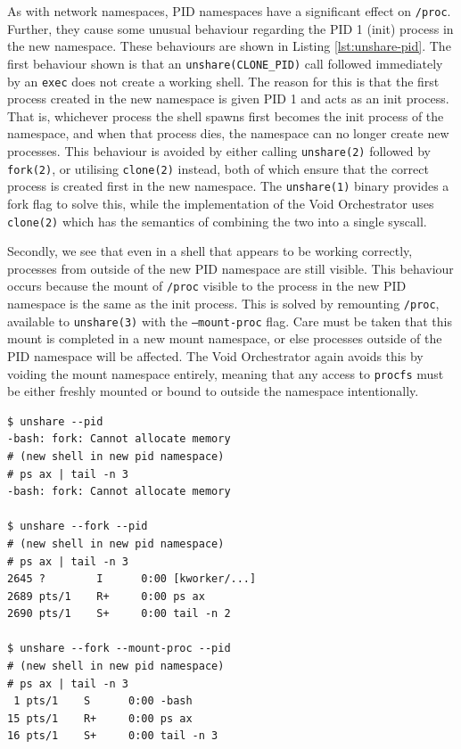 \documentclass[12pt,a4paper,twoside]{report}
\begin{document}
As with network namespaces, PID namespaces have a significant effect on \texttt{/proc}. Further, they cause some unusual behaviour regarding the PID 1 (init) process in the new namespace. These behaviours are shown in Listing \ref{lst:unshare-pid}. The first behaviour shown is that an \texttt{unshare(CLONE\_PID)} call followed immediately by an \texttt{exec} does not create a working shell. The reason for this is that the first process created in the new namespace is given PID 1 and acts as an init process. That is, whichever process the shell spawns first becomes the init process of the namespace, and when that process dies, the namespace can no longer create new processes. This behaviour is avoided by either calling \texttt{unshare(2)} followed by \texttt{fork(2)}, or utilising \texttt{clone(2)} instead, both of which ensure that the correct process is created first in the new namespace. The \texttt{unshare(1)} binary provides a fork flag to solve this, while the implementation of the Void Orchestrator uses \texttt{clone(2)} which has the semantics of combining the two into a single syscall.

Secondly, we see that even in a shell that appears to be working correctly, processes from outside of the new PID namespace are still visible. This behaviour occurs because the mount of \texttt{/proc} visible to the process in the new PID namespace is the same as the init process. This is solved by remounting \texttt{/proc}, available to \texttt{unshare(3)} with the \texttt{---mount-proc} flag. Care must be taken that this mount is completed in a new mount namespace, or else processes outside of the PID namespace will be affected. The Void Orchestrator again avoids this by voiding the mount namespace entirely, meaning that any access to \texttt{procfs} must be either freshly mounted or bound to outside the namespace intentionally.

\begin{lstlisting}[float,label={lst:unshare-pid}]
$ unshare --pid
-bash: fork: Cannot allocate memory
# (new shell in new pid namespace)
# ps ax | tail -n 3
-bash: fork: Cannot allocate memory

$ unshare --fork --pid
# (new shell in new pid namespace)
# ps ax | tail -n 3
2645 ?        I      0:00 [kworker/...]
2689 pts/1    R+     0:00 ps ax
2690 pts/1    S+     0:00 tail -n 2

$ unshare --fork --mount-proc --pid
# (new shell in new pid namespace)
# ps ax | tail -n 3
 1 pts/1    S      0:00 -bash
15 pts/1    R+     0:00 ps ax
16 pts/1    S+     0:00 tail -n 3

\end{lstlisting}
\end{document}
